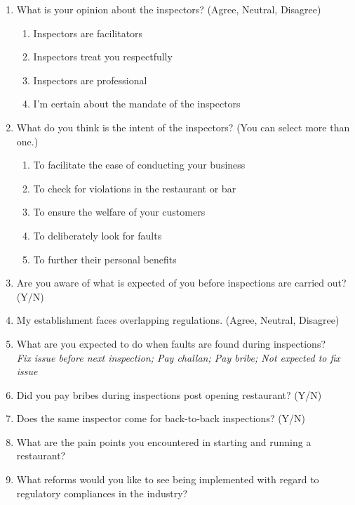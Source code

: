 \documentclass[a4paper, 12pt]{article}
\begin{document}
		\begin {enumerate}[nosep]
		\item What is your opinion about the inspectors? (Agree, Neutral, Disagree)
			\begin {enumerate}[nosep]
			\item Inspectors are facilitators
			\item Inspectors treat you respectfully
			\item Inspectors are professional
			\item I’m certain about the mandate of the inspectors
			\end {enumerate}
		\item What do you think is the intent of the inspectors? (You can select more than one.)
			\begin {enumerate}[nosep]
			\item To facilitate the ease of conducting your business
			\item To check for violations in the restaurant or bar
			\item To ensure the welfare of your customers
			\item To deliberately look for faults
			\item To further their personal benefits
			\end {enumerate}
		\item Are you aware of what is expected of you before inspections are carried out?(Y/N)
		\item My establishment faces overlapping regulations. (Agree, Neutral, Disagree)
		\item What are you expected to do when faults are found during inspections?\\
		\textit{Fix issue before next inspection; Pay challan; Pay bribe; Not expected to fix issue}
		\item Did you pay bribes during inspections post opening restaurant? (Y/N)
		\item Does the same inspector come for back-to-back inspections? (Y/N)
		\item What are the pain points you encountered in starting and running a restaurant?
		\item What reforms would you like to see being implemented with regard to regulatory compliances in the industry?
		\end {enumerate}
       

                    
                    
                    
\end{document}

